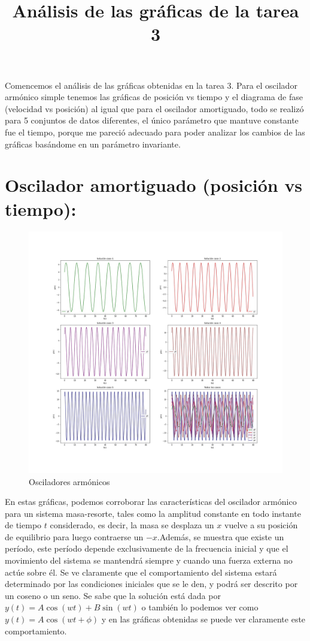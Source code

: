 \documentclass{article}
\title{Análisis de las gráficas de la tarea 3}
\date{}
\begin{document}
\maketitle

Comencemos el análisis de las gráficas obtenidas en la tarea 3. Para el oscilador armónico simple tenemos las gráficas de posición vs tiempo y el diagrama de fase (velocidad vs posición) al igual que para el oscilador amortiguado, todo se realizó para 5 conjuntos de datos diferentes, el único parámetro que mantuve constante fue el tiempo, porque me pareció adecuado para poder analizar los cambios de las gráficas basándome en un parámetro invariante. 

\section{Oscilador amortiguado (posición vs tiempo):}

\begin{figure}[htp]
    \centering
    \includegraphics[width=17cm]{Oscilador.jpg}
    \caption{Osciladores armónicos}
    \label{fig:oscilador1}
\end{figure}

En estas gráficas, podemos corroborar las características del oscilador armónico para un sistema masa-resorte, tales como la amplitud constante en todo instante de tiempo $t$ considerado, es decir, la masa se desplaza un $x$ vuelve a su posición de equilibrio para luego contraerse un $-x$.Además, se muestra que existe un período, este período depende exclusivamente de la frecuencia inicial y que el movimiento del sistema se mantendrá siempre y cuando una fuerza externa no actúe sobre él. Se ve claramente que el comportamiento del sistema estará determinado por las condiciones iniciales que se le den, y podrá ser descrito por un coseno o un seno. Se sabe que la solución está dada por $y(t)= A\cos(wt)+B\sin(wt)$ o también lo podemos ver como $y(t)=A\cos(wt+\phi)$ y en las gráficas obtenidas se puede ver claramente este comportamiento.
\end{document}
